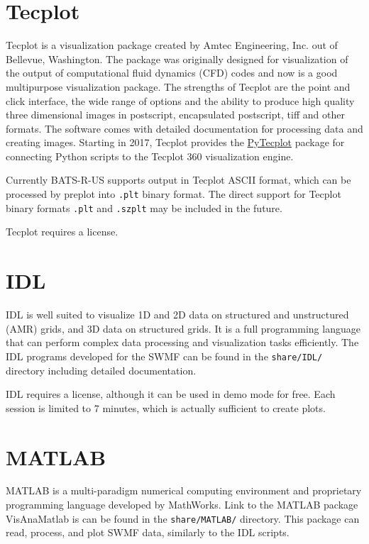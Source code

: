 \section{Tecplot}

Tecplot is a visualization package created by Amtec Engineering, Inc.
out of Bellevue, Washington.
The package was originally designed for visualization of the output of
computational fluid dynamics (CFD) codes and now is a good multipurpose
visualization package.  
The strengths of Tecplot are the point and click interface, the 
wide range of options and the ability to produce high quality
three dimensional images in postscript, encapsulated postscript, tiff
and other formats.
The software comes with detailed documentation for processing data and creating
images.
Starting in 2017, Tecplot provides the \href{https://www.tecplot.com/docs/pytecplot/}{PyTecplot} package for connecting Python scripts to the Tecplot 360
visualization engine.

Currently BATS-R-US supports output in Tecplot ASCII format, which can be
processed by preplot into \verb|.plt| binary format.
The direct support for Tecplot binary formats \verb|.plt| and \verb|.szplt|
may be included in the future.

Tecplot requires a license.

\section{IDL}

IDL is well suited to visualize 1D and 2D data on structured and unstructured
(AMR) grids, and 3D data on structured grids. 
It is a full programming language that can perform complex data processing and
visualization tasks efficiently.
The IDL programs developed for the SWMF can be found in the {\tt share/IDL/}
directory including detailed documentation.

IDL requires a license, although it can be used in demo mode for free.
Each session is limited to 7 minutes, which is actually sufficient to create
plots.

\section{MATLAB}

MATLAB is a multi-paradigm numerical computing environment and proprietary
programming language developed by MathWorks.
Link to the MATLAB package VisAnaMatlab is can be found in the {\tt share/MATLAB/} directory.
This package can read, process, and plot SWMF data, similarly to the IDL scripts.

